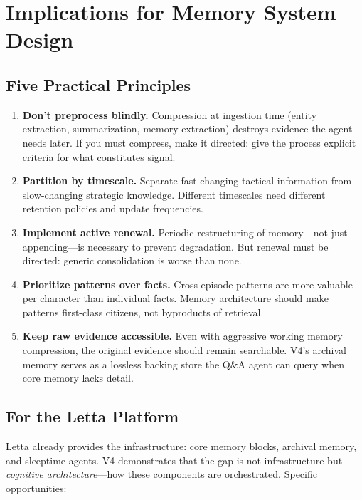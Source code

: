 \documentclass[11pt,letterpaper]{article}
\begin{document}
\section{Implications for Memory System Design}
\label{sec:implications}

\subsection{Five Practical Principles}

\begin{enumerate}[nosep]
  \item \textbf{Don't preprocess blindly.} Compression at ingestion time (entity extraction, summarization, memory extraction) destroys evidence the agent needs later. If you must compress, make it directed: give the process explicit criteria for what constitutes signal.

  \item \textbf{Partition by timescale.} Separate fast-changing tactical information from slow-changing strategic knowledge. Different timescales need different retention policies and update frequencies.

  \item \textbf{Implement active renewal.} Periodic restructuring of memory---not just appending---is necessary to prevent degradation. But renewal must be directed: generic consolidation is worse than none.

  \item \textbf{Prioritize patterns over facts.} Cross-episode patterns are more valuable per character than individual facts. Memory architecture should make patterns first-class citizens, not byproducts of retrieval.

  \item \textbf{Keep raw evidence accessible.} Even with aggressive working memory compression, the original evidence should remain searchable. V4's archival memory serves as a lossless backing store the Q\&A agent can query when core memory lacks detail.
\end{enumerate}

\subsection{For the Letta Platform}

Letta already provides the infrastructure: core memory blocks, archival memory, and sleeptime agents. V4 demonstrates that the gap is not infrastructure but \emph{cognitive architecture}---how these components are orchestrated. Specific opportunities:
\end{document}
